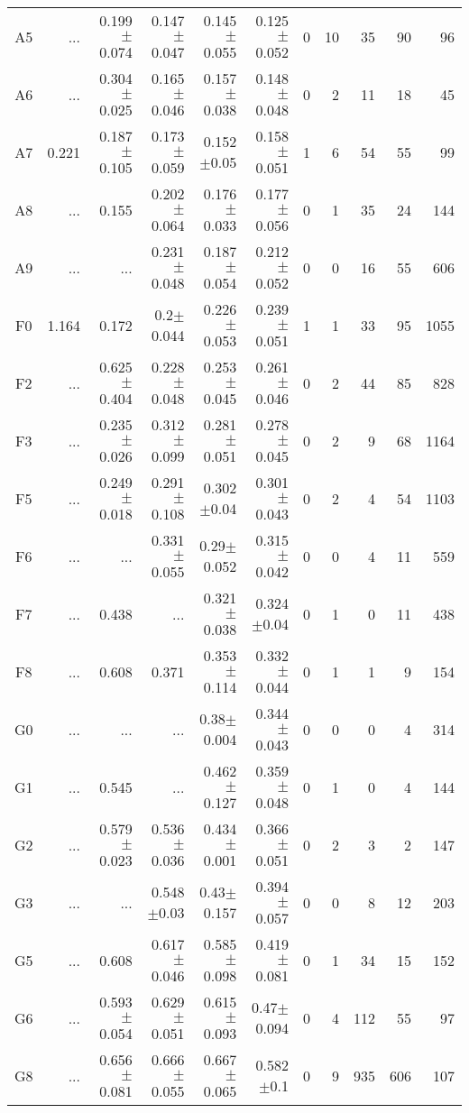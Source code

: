 \begin{table}[t]
\begin{center}
\begin{tabular}{c|rrrrr|rrrrr}
A5	&	 ...	&	0.199$\pm$0.074	&	0.147$\pm$0.047	&	0.145$\pm$0.055	&	0.125$\pm$0.052	&	0	&	10	&	35	&	90	&	96	\\
A6	&	 ...	&	0.304$\pm$0.025	&	0.165$\pm$0.046	&	0.157$\pm$0.038	&	0.148$\pm$0.048	&	0	&	2	&	11	&	18	&	45	\\
A7	&	0.221	&	0.187$\pm$0.105	&	0.173$\pm$0.059	&	0.152$\pm$0.05	&	0.158$\pm$0.051	&	1	&	6	&	54	&	55	&	99	\\
A8	&	 ...	&	0.155	&	0.202$\pm$0.064	&	0.176$\pm$0.033	&	0.177$\pm$0.056	&	0	&	1	&	35	&	24	&	144	\\
A9	&	 ...	&	 ...	&	0.231$\pm$0.048	&	0.187$\pm$0.054	&	0.212$\pm$0.052	&	0	&	0	&	16	&	55	&	606	\\
F0	&	1.164	&	0.172	&	0.2$\pm$0.044	&	0.226$\pm$0.053	&	0.239$\pm$0.051	&	1	&	1	&	33	&	95	&	1055	\\
F2	&	 ...	&	0.625$\pm$0.404	&	0.228$\pm$0.048	&	0.253$\pm$0.045	&	0.261$\pm$0.046	&	0	&	2	&	44	&	85	&	828	\\
F3	&	 ...	&	0.235$\pm$0.026	&	0.312$\pm$0.099	&	0.281$\pm$0.051	&	0.278$\pm$0.045	&	0	&	2	&	9	&	68	&	1164	\\
F5	&	 ...	&	0.249$\pm$0.018	&	0.291$\pm$0.108	&	0.302$\pm$0.04	&	0.301$\pm$0.043	&	0	&	2	&	4	&	54	&	1103	\\
F6	&	 ...	&	 ...	&	0.331$\pm$0.055	&	0.29$\pm$0.052	&	0.315$\pm$0.042	&	0	&	0	&	4	&	11	&	559	\\
F7	&	 ...	&	0.438	&	 ...	&	0.321$\pm$0.038	&	0.324$\pm$0.04	&	0	&	1	&	0	&	11	&	438	\\
F8	&	 ...	&	0.608	&	0.371	&	0.353$\pm$0.114	&	0.332$\pm$0.044	&	0	&	1	&	1	&	9	&	154	\\
G0	&	 ...	&	 ...	&	 ...	&	0.38$\pm$0.004	&	0.344$\pm$0.043	&	0	&	0	&	0	&	4	&	314	\\
G1	&	 ...	&	0.545	&	 ...	&	0.462$\pm$0.127	&	0.359$\pm$0.048	&	0	&	1	&	0	&	4	&	144	\\
G2	&	 ...	&	0.579$\pm$0.023	&	0.536$\pm$0.036	&	0.434$\pm$0.001	&	0.366$\pm$0.051	&	0	&	2	&	3	&	2	&	147	\\
G3	&	 ...	&	 ...	&	0.548$\pm$0.03	&	0.43$\pm$0.157	&	0.394$\pm$0.057	&	0	&	0	&	8	&	12	&	203	\\
G5	&	 ...	&	0.608	&	0.617$\pm$0.046	&	0.585$\pm$0.098	&	0.419$\pm$0.081	&	0	&	1	&	34	&	15	&	152	\\
G6	&	 ...	&	0.593$\pm$0.054	&	0.629$\pm$0.051	&	0.615$\pm$0.093	&	0.47$\pm$0.094	&	0	&	4	&	112	&	55	&	97	\\
G8	&	 ...	&	0.656$\pm$0.081	&	0.666$\pm$0.055	&	0.667$\pm$0.065	&	0.582$\pm$0.1	&	0	&	9	&	935	&	606	&	107	\\

\end{tabular}
\end{center}
\end{table}
